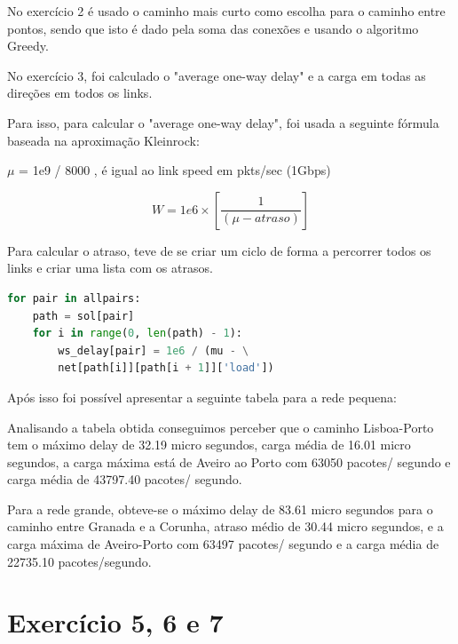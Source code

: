 \documentclass[pdftex,12pt,a4paper]{report}
\begin{document}
No exercício 2 é usado o caminho mais curto como escolha para o caminho entre pontos, sendo que isto é dado pela soma das conexões e usando o algoritmo Greedy.

No exercício 3, foi calculado o "average one-way delay" e a carga em todas as direções em todos os links.

Para isso, para calcular o "average one-way delay", foi usada a seguinte fórmula baseada na aproximação Kleinrock:

$\mu$ = 1e9 / 8000 , é igual ao link speed em pkts/sec (1Gbps)

\[W = 1e6\times\left[\frac{1}{\left(\mu-atraso\right)}\right]\]

Para calcular o atraso, teve de se criar um ciclo de forma a percorrer todos os links e criar uma lista com os atrasos.

\begin{lstlisting}[language=python]
for pair in allpairs:
    path = sol[pair]
    for i in range(0, len(path) - 1):
        ws_delay[pair] = 1e6 / (mu - \
        net[path[i]][path[i + 1]]['load'])
\end{lstlisting}

Após isso foi possível apresentar a seguinte tabela para a rede pequena:



Analisando a tabela obtida conseguimos perceber que o caminho Lisboa-Porto tem o máximo delay de 32.19 micro segundos, carga média de 16.01 micro segundos, a carga máxima está de Aveiro ao Porto com 63050 pacotes/ segundo e carga média de 43797.40 pacotes/ segundo.





Para a rede grande, obteve-se o máximo delay de 83.61 micro segundos para o caminho entre Granada e a Corunha, atraso médio de 30.44 micro segundos, e a carga máxima de Aveiro-Porto com 63497 pacotes/ segundo e a carga média de 22735.10 pacotes/segundo.





\newpage

\section{Exercício 5, 6 e 7}
\end{document}
